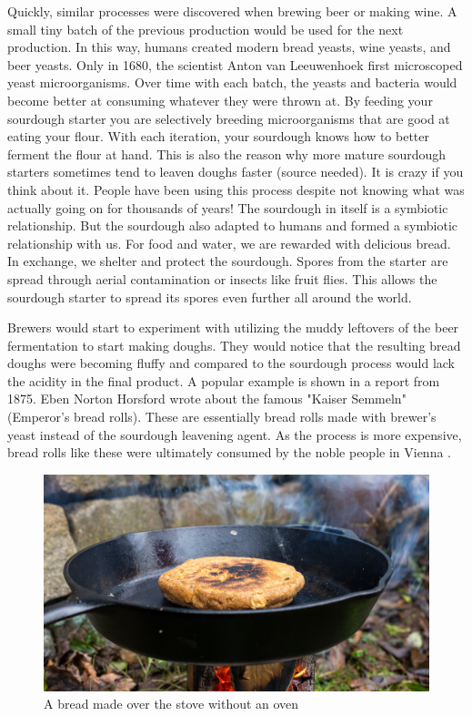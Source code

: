 Quickly, similar processes were discovered when brewing beer
or making wine. A small tiny batch of the previous production
would be used for the next production. In this way, humans created
modern bread yeasts, wine yeasts, and beer yeasts. Only in 1680,
the scientist Anton van Leeuwenhoek first microscoped yeast
microorganisms. Over time with each batch, the yeasts and bacteria
would become better at consuming whatever they were thrown at.
By feeding your sourdough starter you are selectively breeding
microorganisms that are good at eating your flour. With
each iteration, your sourdough knows how to better ferment the flour
at hand. This is also the reason why more mature sourdough starters sometimes
tend to leaven doughs faster (source needed). It is crazy if you
think about it. People have been using this process despite not
knowing what was actually going on for thousands of years! The
sourdough in itself is a symbiotic relationship. But the sourdough
also adapted to humans and formed a symbiotic relationship with us.
For food and water, we are rewarded with delicious bread. In exchange,
we shelter and protect the sourdough. Spores from the starter
are spread through aerial contamination or insects like fruit flies.
This allows the sourdough starter to spread its spores even
further all around the world. 

Brewers would start to experiment with utilizing the muddy leftovers
of the beer fermentation to start making doughs. They would notice
that the resulting bread doughs were becoming fluffy and compared
to the sourdough process would lack the acidity in the final product.
A popular example is shown in a report from 1875. Eben Norton Horsford
wrote about the famous "Kaiser Semmeln" (Emperor's bread rolls).
These are essentially bread rolls made with brewer's yeast instead
of the sourdough leavening agent. As the process is more expensive,
bread rolls like these were ultimately consumed by the noble people
in Vienna \cite{vienna+breadrolls}.

\begin{figure}[h]
  \includegraphics[width=\textwidth]{sourdough-stove}
  \caption{A bread made over the stove without an oven}
  \label{sourdough-stove}
\end{figure}

